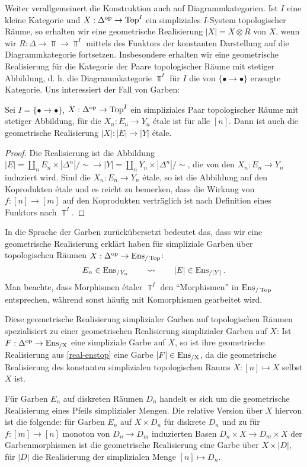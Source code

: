 Weiter verallgemeinert die Konstruktion auch auf
Diagrammkategorien. Ist $I$ eine kleine Kategorie und $X: \Delta^\mathrm{op}
\to \operatorname{Top}^I$ ein simpliziales $I$-System topologischer Räume, so
erhalten wir eine geometrische Realisierung $|X| = X \otimes R$ von
$X$, wenn wir $R: \Delta \to \Top \to \Top^I$ mittels des Funktors der
konstanten Darstellung auf die Diagrammkategorie
fortsetzen. Insbesondere erhalten wir eine geometrische Realisierung
für die Kategorie der Paare topologischer Räume mit stetiger
Abbildung, d. h. die Diagrammkategorie $\Top^I$ für $I$ die von
$\{ \bullet \to \bullet \}$ erzeugte Kategorie. Uns interessiert der
Fall von Garben:
\begin{satz} \label{real-enstop}
  Sei $I = \{ \bullet \to \bullet \}$, $X: \Delta^\mathrm{op} \to \operatorname{Top}^I$ ein
  simpliziales Paar topologischer Räume mit stetiger Abbildung, für
  die $X_n: E_n \to Y_n$ étale ist für alle $[n]$. Dann ist auch die
  geometrische Realisierung $|X|: |E| \to |Y|$ étale.
\end{satz}
\begin{proof}
  Die Realisierung ist die Abbildung $|E| = \coprod_n E_n \times
  |\Delta^n| / \sim \to |Y| = \coprod_n Y_n \times |\Delta^n| / \sim$,
  die von den $X_n: E_n \to Y_n$ induziert wird. Sind die $X_n: E_n
  \to Y_n$ étale, so ist die Abbildung auf den Koprodukten étale und
  es reicht zu bemerken, dass die Wirkung von $f: [n] \to [m]$ auf den
  Koprodukten verträglich ist nach Definition eines Funktors nach
  $\Top^I$.
\end{proof}
In die Sprache der Garben zurückübersetzt bedeutet das, dass wir eine
geometrische Realisierung erklärt haben für simpliziale Garben über
topologischen Räumen $X: \Delta^\mathrm{op} \to \operatorname{Ens}_{/\operatorname{Top}}$:
\[ E_n \in \operatorname{Ens}_{/Y_n} \qquad \rightsquigarrow \qquad |E| \in \operatorname{Ens}_{/|Y|} . \]
Man beachte, dass Morphismen étaler $\Top^I$ den ``Morphismen'' in
$\operatorname{Ens}_{/\operatorname{Top}}$ entsprechen, während sonst häufig mit Komorphismen
gearbeitet wird.
\begin{bem} \label{real-ensx}
  Diese geometrische Realisierung simplizialer Garben auf
  topologischen Räumen spezialisiert zu einer geometrischen
  Realisierung simplizialer Garben auf $X$: Ist
  $F: \Delta^\mathrm{op} \to \operatorname{Ens_{/X}}$ eine simpliziale Garbe auf $X$, so ist ihre
  geometrische Realisierung aus \ref{real-enstop} eine Garbe
  $|F| \in \operatorname{Ens_{/X}}$, da die geometrische Realisierung des konstanten
  simplizialen topologischen Raums $X: [n] \mapsto X$ selbst $X$ ist.

  Für Garben $E_n$ auf diskreten Räumen $D_n$ handelt es sich um die
  geometrische Realisierung eines Pfeils simplizialer Mengen. Die
  relative Version über $X$ hiervon ist die folgende: für Garben $E_n$
  auf $X \times D_n$ für diskrete $D_n$ und zu für $f: [m] \to [n]$
  monoton von $D_n \to D_m$ induzierten Basen $D_n \times X \to
  D_m \times X$ der Garbenmorphismen ist die geometrische Realisierung
  eine Garbe über $X \times |D|$, für $|D|$ die Realisierung der
  simplizialen Menge $[n] \mapsto D_n$.
\end{bem}

